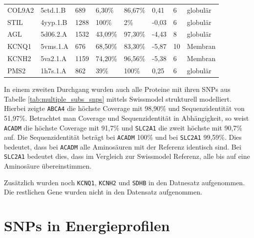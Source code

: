 \begin{table}[H]
{\begin{tabular}{llllllll}
    COL9A2 & 5ctd.1.B & 689 & 6,30\% & 86,67\% & 0,41 & 6 & globulär \\
    STIL & 4yyp.1.B & 1288 & 100\% & 2\% & -0,03 & 6 & globulär \\
    AGL & 5d06.2.A & 1532 & 43,09\% & 97,30\% & -4,43 & 8 & globulär \\
    \rowcolor[HTML]{CBFFCB} 
    KCNQ1 & 5vms.1.A & 676 & 68,50\% & 83,30\% & -5,87 & 10 & Membran \\
    \rowcolor[HTML]{CBFFCB} 
    KCNH2 & 5va2.1.A & 1159 & 74,20\% & 96,56\% & -5,38 & 6 & Membran \\
    PMS2 & 1h7s.1.A & 862 & 39\% & 100\% & 0,25 & 6 & globulär
    \end{tabular}}
\end{table}

In einem zweiten Durchgang wurden auch alle Proteine mit ihren SNPs aus Tabelle \ref{tab:multiple_subs_snps} mittels Swissmodel strukturell modelliert. Hierbei zeigte \texttt{ABCA4} die höchste Coverage mit 98,90\% und Sequenzidentität von 51,97\%. Betrachtet man Coverage und Sequenzidentität in Abhängigkeit, so weist \texttt{ACADM} die höchste Coverage mit 91,7\% und \texttt{SLC2A1} die zweit höchste mit 90,7\% auf. Die Sequenzidentität beträgt bei \texttt{ACADM} 100\% und bei \texttt{SLC2A1} 99,59\%. Dies bedeutet, dass bei \texttt{ACADM} alle Aminosäuren mit der Referenz identisch sind. Bei \texttt{SLC2A1} bedeutet dies, dass im Vergleich zur Swissmodel Referenz, alle bis auf eine Aminosäure übereinstimmen.

Zusätzlich wurden noch \texttt{KCNQ1}, \texttt{KCNH2} und \texttt{SDHB} in den Datnesatz aufgenommen. Die restlichen Gene wurden nicht in den Datensatz aufgenommen.



\section{SNPs in Energieprofilen}

